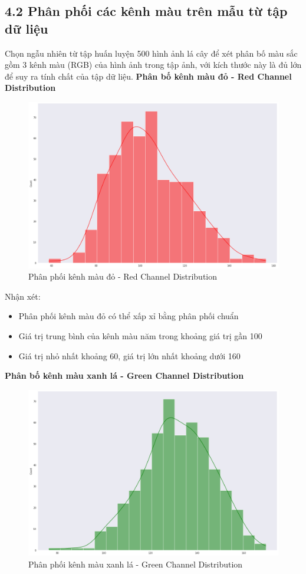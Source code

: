 \documentclass{article}
\begin{document}
	\subsection{4.2 Phân phối các kênh màu trên mẫu từ tập dữ liệu}
	Chọn ngẫu nhiên từ tập huấn luyện 500 hình ảnh lá cây để xét phân bố màu sắc gồm 3 kênh màu (RGB) của hình ảnh trong tập ảnh, với kích thước này là đủ lớn để suy ra tính chất của tập dữ liệu.
	\textbf{Phân bố kênh màu đỏ - Red Channel Distribution}
	\begin{figure}[H]
		\centering
		\includegraphics[width=1\linewidth]{images/red_channel_distribution.png}
		\caption{Phân phối kênh màu đỏ - Red Channel Distribution}
		\label{fig:writing-thesis}
	\end{figure}
	Nhận xét:
	\begin{itemize}
		\item Phân phối kênh màu đỏ có thể xấp xỉ bằng phân phối chuẩn
		\item Giá trị trung bình của kênh màu năm trong khoảng giá trị gần 100
		\item Giá trị nhỏ nhất khoảng 60, giá trị lớn nhất khoảng dưới 160
	\end{itemize}
	\textbf{Phân bố kênh màu xanh lá - Green Channel Distribution}
	\begin{figure}[H]
		\centering
		\includegraphics[width=1\linewidth]{images/green_channel_distribution.png}
		\caption{Phân phối kênh màu xanh lá - Green Channel Distribution}
		\label{fig:writing-thesis}
	\end{figure}
\end{document}

